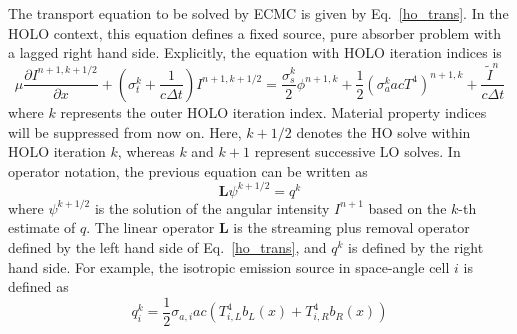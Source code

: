 \documentclass{mc2013}
\newcommand{\pderiv}[2]{\frac{\partial #1}{\partial #2}}
\newcommand{\B}[1]{\ensuremath{\mathbf{#1}}}
\begin{document}

The transport equation to be solved by ECMC is given by Eq.~\eqref{ho_trans}. In the
HOLO context, this equation
defines a fixed source, pure absorber problem with a lagged right hand side. 
Explicitly, the equation with HOLO iteration indices is
\begin{equation}
\mu \pderiv{I^{n+1,k+1/2}}{x} + \left(\sigma_t^k + \frac{1}{c \Delta t }\right)
I^{n+1,k+1/2}
= \frac{\sigma_s^k}{2} \phi^{n+1,k} +\frac{1}{2} \left(\sigma_a^k a c T^4
\right)^{n+1,k} + \frac{\tilde I^n}{c\Delta t} 
\end{equation}
where $k$ represents the outer HOLO iteration index.  Material property indices will be
suppressed from now on.  Here, $k+1/2$ denotes the
HO solve within HOLO iteration $k$, whereas $k$ and $k+1$ represent successive LO
solves.  In operator notation, the previous equation can be written as
\begin{equation}\label{te_oper}
\B L \psi^{k+1/2}  = q^{k}
\end{equation}
where $\psi^{k+1/2}$ is the solution of the angular intensity $I^{n+1}$ based on the $k$-th
estimate of $q$.
The linear operator $\B L$ is the streaming plus
removal operator defined by the left hand
side of Eq.~\eqref{ho_trans}, and $q^k$ is defined by the right hand side.  For example, the isotropic emission source in space-angle cell $i$ is defined as
\begin{equation}
    q_i^k = \frac{1}{2}\sigma_{a,i} a c (T_{i,L}^4b_{L}(x) + T_{i,R}^4 b_{R}(x) ) 
\end{equation}
\end{document}
